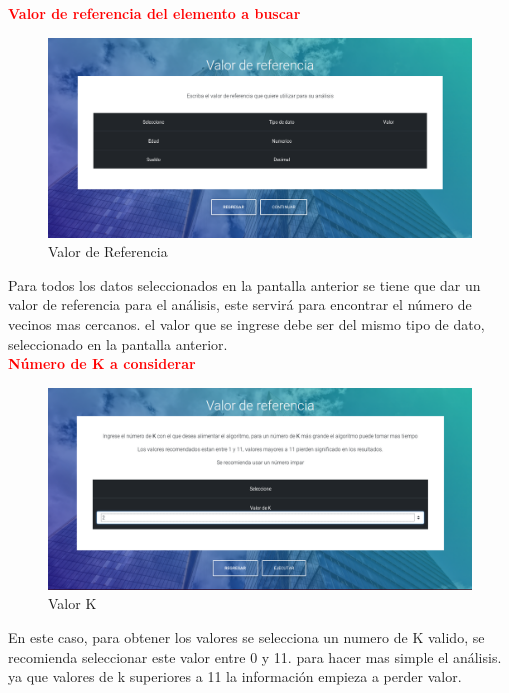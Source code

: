 \textbf{\textcolor{red}{Valor de referencia del elemento a buscar}}
\begin{figure}[H]
	\hypertarget{fig:red}{\hspace{1pt}}
	\begin{center}
		\includegraphics[width=.9\textwidth]{capitulo7/images/referencia.png}
		\caption{Valor de Referencia}
		\label{fig:ref}
	\end{center}
\end{figure}
Para todos los datos seleccionados en la pantalla anterior se tiene que dar un valor de referencia para el análisis, este servirá para encontrar el número de vecinos mas cercanos. el valor que se ingrese debe ser del mismo tipo de dato, seleccionado en la pantalla anterior.\\ 
\textbf{\textcolor{red}{Número de K a considerar}}
\begin{figure}[H]
	\hypertarget{fig:red}{\hspace{1pt}}
	\begin{center}
		\includegraphics[width=.9\textwidth]{capitulo7/images/valorK.png}
		\caption{Valor K}
		\label{fig:ref}
	\end{center}
\end{figure}  
En este caso, para obtener los valores se selecciona un numero de K valido, se recomienda seleccionar este valor entre 0 y 11. para hacer mas simple el análisis. ya que valores de k superiores a 11 la información empieza a perder valor.\\
